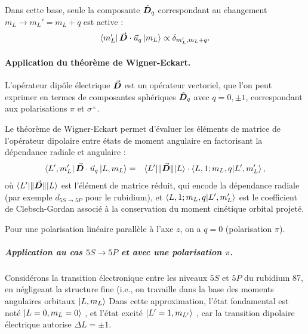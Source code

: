 Dans cette base, seule la composante $\hat{\bm{D}}_q$ correspondant au changement $m_L \to m_L' = m_L + q$ est active :
\begin{eqnarray*}
\bra{m_L'} \vec{{\bm{D}}} \cdot \vec{u}_q \ket{m_L} \propto \delta_{m_L', m_L + q}.
\end{eqnarray*}

\paragraph{Application du théorème de Wigner-Eckart.}

L’opérateur dipôle électrique $\vec{{\bm{D}}}$ est un opérateur vectoriel, que l’on peut exprimer en termes de composantes sphériques $\hat{\bm{D}}_q$ avec $q = 0 , \pm 1 $, correspondant aux polarisations $\pi$  et $\sigma^\pm$.

\medskip

Le théorème de Wigner-Eckart permet d’évaluer les éléments de matrice de l’opérateur dipolaire entre états de moment angulaire en factorisant la dépendance radiale et angulaire :
\begin{eqnarray}
\bra{L', m_{L}'} \vec{{\bm{D}}} \cdot \vec{u}_q \ket{L, m_L}
& = & \bra{L'}\!\|\vec{{\bm{D}}}\|\!\ket{L} \cdot \braket{L, 1; m_L, q | L', m_{L}'} , 
\label{eq:WignerEckart}
\end{eqnarray}
où $\bra{L'}\!\|\vec{{\bm{D}}}\|\!\ket{L}$ est l’élément de matrice réduit, qui encode la dépendance radiale (par exemple $d_{\scriptstyle 5S \rightarrow 5P}$ pour le rubidium), et $\braket{L, 1; m_L, q | L', m_{L}'}$ est le coefficient de Clebsch-Gordan associé à la conservation du moment cinétique orbital projeté.

\medskip
Pour une polarisation linéaire parallèle à l’axe $z$, on a $q=0$ (polarisation $\pi$).

\subparagraph{Application au cas $5S \rightarrow 5P$ et avec une polarisation $\pi$.}


Considérons la transition électronique entre les niveaux $5S$ et $5P$ du rubidium 87, en négligeant la structure fine (i.e., on travaille dans la base des moments angulaires orbitaux $\ket{L , m_L  } $
Dans cette approximation, l'état fondamental est noté $\ket{L = 0, m_L = 0}$ , et l’état excité $\ket{L' = 1, m_{L'}}$ , car la transition dipolaire électrique autorise $\Delta L = \pm 1 $.



